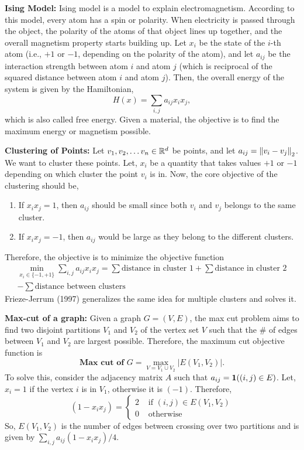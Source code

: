 \documentclass[12pt]{article}
\begin{document}
\textbf{Ising Model:} Ising model is a model to explain electromagnetism. According to this model, every atom has a spin or polarity. When electricity is passed through the object, the polarity of the atoms of that object lines up together, and the overall magnetism property starts building up. Let $x_i$ be the state of the $i$-th atom (i.e., $+1$ or $-1$, depending on the polarity of the atom), and let $a_{ij}$ be the interaction strength between atom $i$ and atom $j$ (which is reciprocal of the squared distance between atom $i$ and atom $j$). Then, the overall energy of the system is given by the Hamiltonian,
\begin{equation*}
    H(x) = \sum_{i,j} a_{ij}x_i x_j,
\end{equation*}
\noindent which is also called free energy. Given a material, the objective is to find the maximum energy or magnetism possible.

\textbf{Clustering of Points:} Let $v_1, v_2, \dots v_n \in \mathbb{R}^d$ be points, and let $a_{ij} = \left\Vert v_i - v_j \right\Vert_2$. We want to cluster these points. Let, $x_i$ be a quantity that takes values $+1$ or $-1$ depending on which cluster the point $v_i$ is in. Now, the core objective of the clustering should be, 
\begin{enumerate}
    \item If $x_ix_j = 1$, then $a_{ij}$ should be small since both $v_i$ and $v_j$ belongs to the same cluster.
    \item If $x_i x_j = -1$, then $a_{ij}$ would be large as they belong to the different clusters.
\end{enumerate}
\noindent Therefore, the objective is to minimize the objective function
\begin{multline*}
    \min_{x_i \in \{ -1, +1\}} \sum_{i,j}a_{ij}x_i x_j = \sum \text{distance in cluster 1} + \sum \text{distance in cluster 2}\\
    - \sum \text{distance between clusters}
\end{multline*}
\noindent Frieze-Jerrum (1997) generalizes the same idea for multiple clusters and solves it.

\textbf{Max-cut of a graph:} Given a graph $G = (V, E)$, the max cut problem aims to find two disjoint partitions $V_1$ and $V_2$ of the vertex set $V$ such that the \# of edges between $V_1$ and $V_2$ are largest possible. Therefore, the maximum cut objective function is
\begin{equation*}
    \textbf{Max cut of } G = \max_{V = V_1 \cup V_2} \vert E(V_1, V_2)\vert.
\end{equation*}
\noindent To solve this, consider the adjacency matrix $A$ such that $a_{ij} = \boldsymbol{1}((i, j) \in E)$. Let, $x_i = 1$ if the vertex $i$ is in $V_1$, otherwise it is $(-1)$. Therefore,
\begin{equation*}
    (1 - x_i x_j) = \begin{cases}
        2 & \text{ if } (i, j) \in E(V_1, V_2)\\
        0 & \text{ otherwise }
    \end{cases}
\end{equation*}
\noindent So, $E(V_1, V_2)$ is the number of edges between crossing over two partitions and is given by $\sum_{i,j} a_{ij}(1 - x_ix_j)/4$. 
\end{document}
